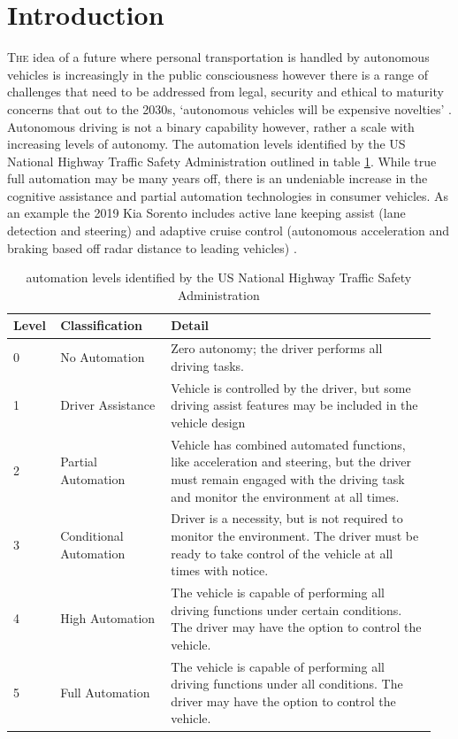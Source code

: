 \documentclass[]{aiaa-tc}%
\begin{document}
\newpage
\section{Introduction} \label{sect:intro}

\lettrine[nindent=0pt]{T}{he} idea of a future where personal transportation is handled by autonomous vehicles is increasingly in the public consciousness however there is a range of challenges that need to be addressed from legal, security and ethical \citep{gmReport} to maturity concerns that out to the 2030s, `autonomous vehicles will be expensive novelties' \citep{vicTransportImplications}. Autonomous driving is not a binary capability however, rather a scale with increasing levels of autonomy. The automation levels identified by the US National Highway Traffic Safety Administration \citep{automationVisionForSafety} outlined in table \ref{t:automationLevels}. While true full automation may be many years off, there is an undeniable increase in the cognitive assistance and partial automation technologies in consumer vehicles. As an example the 2019 Kia Sorento includes active lane keeping assist (lane detection and steering) and adaptive cruise control (autonomous acceleration and braking based off radar distance to leading vehicles) \citep{kia}. 


\begin{table}%
 \begin{center}
  \caption{automation levels identified by the US National Highway Traffic Safety Administration \citep{automationVisionForSafety}}
  \label{t:automationLevels}
  \begin{tabular}{p{0.1\linewidth}p{0.25\linewidth}p{0.6\linewidth}}
       Level & Classification & Detail\\\hline
        0 &  No Automation & Zero autonomy; the driver performs all driving tasks. \\
       1 &  Driver Assistance & Vehicle is controlled by the driver, but some driving assist features may be included in the vehicle design \\
       2 &  Partial Automation & Vehicle has combined automated functions, like acceleration and steering, but the driver must remain engaged with the driving task and monitor the environment at all times. \\
       3 &  Conditional Automation &   Driver is a necessity, but is not required to monitor the environment. The driver must be ready to take control of the vehicle at all times with notice. \\
      4 &  High Automation &   The vehicle is capable of performing all driving functions under certain conditions. The driver may have the option to control the vehicle. \\
      5 &   Full Automation &   The vehicle is capable of performing all driving functions under all conditions. The driver may have the option to control the vehicle. 
  \end{tabular}
 \end{center}
\end{table}
\end{document}
